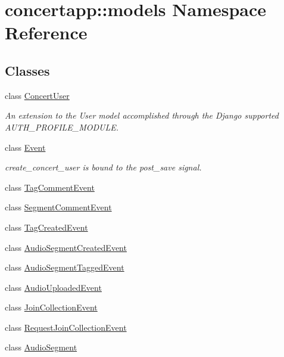 \hypertarget{namespaceconcertapp_1_1models}{
\section{concertapp::models Namespace Reference}
\label{namespaceconcertapp_1_1models}
}
\subsection*{Classes}
\begin{DoxyCompactItemize}
\item 
class \hyperlink{classconcertapp_1_1models_1_1_concert_user}{ConcertUser}
\begin{DoxyCompactList}\small\item\em An extension to the User model accomplished through the Django supported AUTH\_\-PROFILE\_\-MODULE. \item\end{DoxyCompactList}\item 
class \hyperlink{classconcertapp_1_1models_1_1_event}{Event}
\begin{DoxyCompactList}\small\item\em create\_\-concert\_\-user is bound to the post\_\-save signal. \item\end{DoxyCompactList}\item 
class \hyperlink{classconcertapp_1_1models_1_1_tag_comment_event}{TagCommentEvent}
\item 
class \hyperlink{classconcertapp_1_1models_1_1_segment_comment_event}{SegmentCommentEvent}
\item 
class \hyperlink{classconcertapp_1_1models_1_1_tag_created_event}{TagCreatedEvent}
\item 
class \hyperlink{classconcertapp_1_1models_1_1_audio_segment_created_event}{AudioSegmentCreatedEvent}
\item 
class \hyperlink{classconcertapp_1_1models_1_1_audio_segment_tagged_event}{AudioSegmentTaggedEvent}
\item 
class \hyperlink{classconcertapp_1_1models_1_1_audio_uploaded_event}{AudioUploadedEvent}
\item 
class \hyperlink{classconcertapp_1_1models_1_1_join_collection_event}{JoinCollectionEvent}
\item 
class \hyperlink{classconcertapp_1_1models_1_1_request_join_collection_event}{RequestJoinCollectionEvent}
\item 
class \hyperlink{classconcertapp_1_1models_1_1_audio_segment}{AudioSegment}

\end{DoxyCompactItemize}
